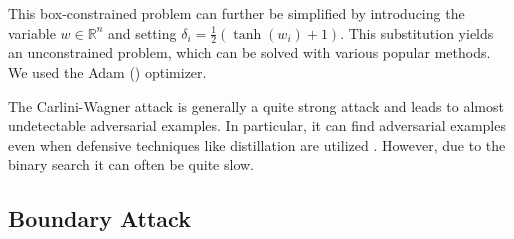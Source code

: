 This box-constrained problem can further be simplified by introducing the variable $w \in \mathbb{R}^n$ and setting $\delta_i = \frac{1}{2} (\tanh(w_i) + 1)$.
This substitution yields an unconstrained problem, which can be solved with various popular methods. We used the Adam (\cite{adam}) optimizer.

The Carlini-Wagner attack is generally a quite strong attack and leads to almost undetectable adversarial examples.
In particular, it can find adversarial examples even when defensive techniques like distillation are utilized \cite{carlini}.
However, due to the binary search it can often be quite slow.

\subsection{Boundary Attack}
